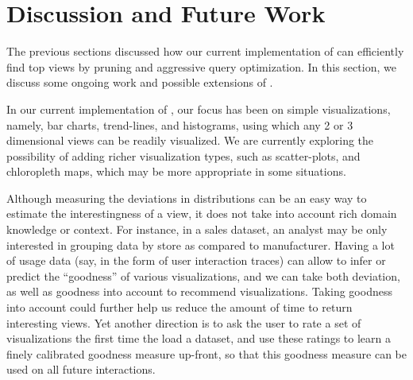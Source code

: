 

\section{Discussion and Future Work}
\label{sec:discussion}
The previous sections discussed how our current implementation of \VizRecDB can
efficiently find top views by pruning and aggressive query optimization.
In this section, we discuss some ongoing work and possible extensions of
\VizRecDB.

 In our current implementation
of \VizRecDB, our focus has been on simple visualizations, namely, bar charts, trend-lines,
and histograms, using which any 2 or 3 dimensional views can be readily visualized.
We are currently exploring the possibility of adding richer visualization types,
such as scatter-plots, and chloropleth maps, which may be more appropriate
in some situations. 

 Although measuring the 
deviations in distributions can be an easy way to estimate the interestingness of a 
view, it does not take into account rich domain knowledge or context.
For instance, in a sales dataset, an analyst may be only interested in grouping
data by store as compared to manufacturer. 
Having a lot of usage data (say, in the form of user interaction traces)
can allow \VizRecDB to infer or predict the ``goodness''
of various visualizations, and we can take both deviation, as well as 
goodness into account to recommend visualizations. 
Taking goodness into account could further help us reduce the amount of time
to return interesting views.
Yet another direction is to ask the user to rate a set of visualizations
the first time the load a dataset, and use these ratings to 
learn a finely calibrated goodness measure up-front,
so that this goodness measure can be used on all future interactions.

 



